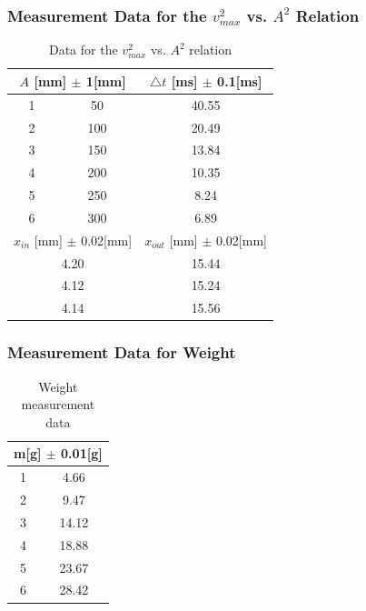 \documentclass[12pt]{article}
\begin{document}
\subsubsection{Measurement Data for the $v_{max}^2$ vs. $A^2$ Relation}
\begin{table}[H]
\centering
\begin{tabular}{|c|c|c|}
\hline
\multicolumn{2}{|c|}{$A$ {[}mm{]} $\pm$ 1{[}mm{]}}    & $\bigtriangleup{t}$ {[}ms{]} $\pm$ 0.1{[}ms{]}   \\ \hline
1                     & 50                     & 40.55                    \\ \hline
2                     & 100                    & 20.49                    \\ \hline
3                     & 150                    & 13.84                    \\ \hline
4                     & 200                    & 10.35                    \\ \hline
5                     & 250                    & 8.24                     \\ \hline
6                     & 300                    & 6.89                     \\ \hline
\multicolumn{2}{|c|}{$x_{in}$ {[}mm{]} $\pm$ 0.02{[}mm{]}} & $x_{out}$ {[}mm{]} $\pm$ 0.02{[}mm{]} \\ \hline
\multicolumn{2}{|c|}{4.20}                     & 15.44                    \\ \hline
\multicolumn{2}{|c|}{4.12}                     & 15.24                    \\ \hline
\multicolumn{2}{|c|}{4.14}                     & 15.56                    \\ \hline
\end{tabular}
\caption{Data for the $v_{max}^2$ vs. $A^2$ relation}
\end{table}
\subsubsection{Measurement Data for Weight}
\begin{table}[H]
\centering
\begin{tabular}{|c|c|}
\hline
\multicolumn{2}{|c|}{m{[}g{]} $\pm$ 0.01{[}g{]}} \\ \hline
1                  & 4.66                  \\ \hline
2                  & 9.47                  \\ \hline
3                  & 14.12                 \\ \hline
4                  & 18.88                 \\ \hline
5                  & 23.67                 \\ \hline
6                  & 28.42                 \\ \hline
\end{tabular}
\caption{Weight measurement data}
\end{table}
\end{document}
